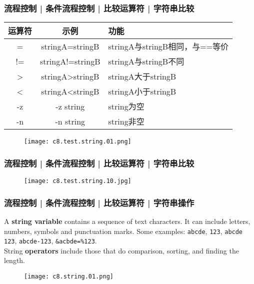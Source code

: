 \begin{frame}
  \frametitle{流程控制 | 条件流程控制 | 比较运算符 | \alert{字符串比较}}
  \begin{table}
    \centering
    \begin{tabularx}{\textwidth}{ccX}
      \hline
      \rowcolor{blue!50}运算符 & 示例 & 功能\\
      \hline
      = & stringA=stringB & stringA与stringB相同，与==等价\\
      != & stringA!=stringB & stringA与stringB不同\\
      > & stringA>stringB & stringA大于stringB\\
      < & stringA<stringB & stringA小于stringB\\
      -z & -z string & string为空\\
      -n & -n string & string非空\\
      \hline
    \end{tabularx}
  \end{table}
  \begin{figure}
    \centering
    \texttt{[image: c8.test.string.01.png]}
  \end{figure}
\end{frame}

\begin{frame}
  \frametitle{流程控制 | 条件流程控制 | 比较运算符 | 字符串比较}
  \begin{figure}
    \centering
    \texttt{[image: c8.test.string.10.jpg]}
  \end{figure}
\end{frame}

\begin{frame}[fragile]
  \frametitle{流程控制 | 条件流程控制 | 比较运算符 | 字符串操作}
  A \textbf{string variable} contains a sequence of text characters. It can include letters, numbers, symbols and punctuation marks. Some examples: \verb|abcde|, \verb|123|, \verb|abcde 123|, \verb|abcde-123|, \verb|&acbde=%123|.\\
  \vspace{0.2cm}
  String \textbf{operators} include those that do comparison, sorting, and finding the length.
  \begin{figure}
    \centering
    \texttt{[image: c8.string.01.png]}
  \end{figure}
\end{frame}


